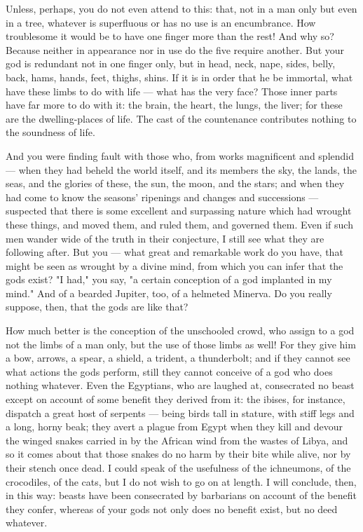  Unless, perhaps, you do not even attend to this: that, not in a man only but even in a tree, whatever is superfluous or has no use is an encumbrance. How troublesome it would be to have one finger more than the rest! And why so? Because neither in appearance nor in use do the five require another. But your god is redundant not in one finger only, but in head, neck, nape, sides, belly, back, hams, hands, feet, thighs, shins. If it is in order that he be immortal, what have these limbs to do with life — what has the very face? Those inner parts have far more to do with it: the brain, the heart, the lungs, the liver; for these are the dwelling-places of life. The cast of the countenance contributes nothing to the soundness of life.

 And you were finding fault with those who, from works magnificent and splendid — when they had beheld the world itself, and its members the sky, the lands, the seas, and the glories of these, the sun, the moon, and the stars; and when they had come to know the seasons' ripenings and changes and successions — suspected that there is some excellent and surpassing nature which had wrought these things, and moved them, and ruled them, and governed them. Even if such men wander wide of the truth in their conjecture, I still see what they are following after. But you — what great and remarkable work do you have, that might be seen as wrought by a divine mind, from which you can infer that the gods exist? "I had," you say, "a certain conception of a god implanted in my mind." And of a bearded Jupiter, too, of a helmeted Minerva. Do you really suppose, then, that the gods are like that?

 How much better is the conception of the unschooled crowd, who assign to a god not the limbs of a man only, but the use of those limbs as well! For they give him a bow, arrows, a spear, a shield, a trident, a thunderbolt; and if they cannot see what actions the gods perform, still they cannot conceive of a god who does nothing whatever. Even the Egyptians, who are laughed at, consecrated no beast except on account of some benefit they derived from it: the ibises, for instance, dispatch a great host of serpents — being birds tall in stature, with stiff legs and a long, horny beak; they avert a plague from Egypt when they kill and devour the winged snakes carried in by the African wind from the wastes of Libya, and so it comes about that those snakes do no harm by their bite while alive, nor by their stench once dead. I could speak of the usefulness of the ichneumons, of the crocodiles, of the cats, but I do not wish to go on at length. I will conclude, then, in this way: beasts have been consecrated by barbarians on account of the benefit they confer, whereas of your gods not only does no benefit exist, but no deed whatever.

